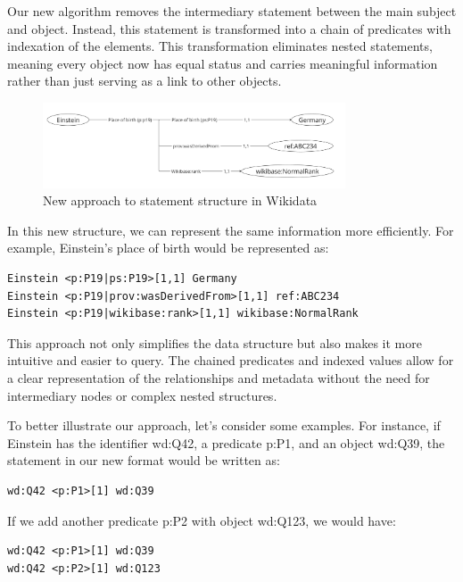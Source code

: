 Our new algorithm removes the intermediary statement between the main subject and object. Instead, this statement is transformed into a chain of predicates with indexation of the elements. This transformation eliminates nested statements, meaning every object now has equal status and carries meaningful information rather than just serving as a link to other objects.

\begin{figure}[htbp]
    \centering
    \includegraphics[width=0.8\textwidth]{15.png}
    \caption{New approach to statement structure in Wikidata}
    \label{fig:image15}
\end{figure}

In this new structure, we can represent the same information more efficiently. For example, Einstein's place of birth would be represented as:

{\footnotesize
\begin{verbatim}
Einstein <p:P19|ps:P19>[1,1] Germany
Einstein <p:P19|prov:wasDerivedFrom>[1,1] ref:ABC234
Einstein <p:P19|wikibase:rank>[1,1] wikibase:NormalRank
\end{verbatim}
}

This approach not only simplifies the data structure but also makes it more intuitive and easier to query. The chained predicates and indexed values allow for a clear representation of the relationships and metadata without the need for intermediary nodes or complex nested structures.

To better illustrate our approach, let's consider some examples. For instance, if Einstein has the identifier wd:Q42, a predicate p:P1, and an object wd:Q39, the statement in our new format would be written as:

{\footnotesize
\begin{verbatim}
wd:Q42 <p:P1>[1] wd:Q39
\end{verbatim}
}

If we add another predicate p:P2 with object wd:Q123, we would have:

{\footnotesize
\begin{verbatim}
wd:Q42 <p:P1>[1] wd:Q39
wd:Q42 <p:P2>[1] wd:Q123
\end{verbatim}
}

